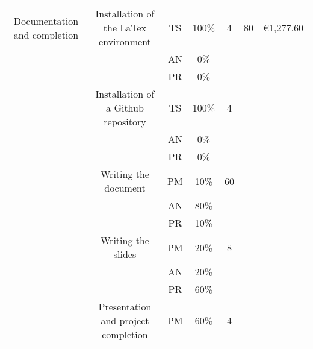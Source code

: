 \begin{table}[p]
\begin{center}
{\begin{tabular}{|c|l|c|c|l|l|l|}
\multicolumn{ 1}{|c|}{Documentation and completion} & \multicolumn{ 1}{c|}{Installation of the LaTex environment} & TS & 100\% & \multicolumn{ 1}{c|}{4} & \multicolumn{ 1}{c|}{80} & \multicolumn{ 1}{c|}{\textgreek{\euro}1,277.60} \\ \cline{ 3- 4}
\multicolumn{ 1}{|c|}{} & \multicolumn{ 1}{l|}{} & AN & 0\% & \multicolumn{ 1}{l|}{} & \multicolumn{ 1}{l|}{} & \multicolumn{ 1}{l|}{} \\ \cline{ 3- 4}
\multicolumn{ 1}{|c|}{} & \multicolumn{ 1}{l|}{} & PR & 0\% & \multicolumn{ 1}{l|}{} & \multicolumn{ 1}{l|}{} & \multicolumn{ 1}{l|}{} \\ \cline{ 2- 5}
\multicolumn{ 1}{|c|}{} & \multicolumn{ 1}{c|}{Installation of a Github repository} & TS & 100\% & \multicolumn{ 1}{c|}{4} & \multicolumn{ 1}{l|}{} & \multicolumn{ 1}{l|}{} \\ \cline{ 3- 4}
\multicolumn{ 1}{|c|}{} & \multicolumn{ 1}{l|}{} & AN & 0\% & \multicolumn{ 1}{l|}{} & \multicolumn{ 1}{l|}{} & \multicolumn{ 1}{l|}{} \\ \cline{ 3- 4}
\multicolumn{ 1}{|c|}{} & \multicolumn{ 1}{l|}{} & PR & 0\% & \multicolumn{ 1}{l|}{} & \multicolumn{ 1}{l|}{} & \multicolumn{ 1}{l|}{} \\ \cline{ 2- 5}
\multicolumn{ 1}{|c|}{} & \multicolumn{ 1}{c|}{Writing the document} & PM & 10\% & \multicolumn{ 1}{c|}{60} & \multicolumn{ 1}{l|}{} & \multicolumn{ 1}{l|}{} \\ \cline{ 3- 4}
\multicolumn{ 1}{|c|}{} & \multicolumn{ 1}{l|}{} & AN & 80\% & \multicolumn{ 1}{l|}{} & \multicolumn{ 1}{l|}{} & \multicolumn{ 1}{l|}{} \\ \cline{ 3- 4}
\multicolumn{ 1}{|c|}{} & \multicolumn{ 1}{l|}{} & PR & 10\% & \multicolumn{ 1}{l|}{} & \multicolumn{ 1}{l|}{} & \multicolumn{ 1}{l|}{} \\ \cline{ 2- 5}
\multicolumn{ 1}{|c|}{} & \multicolumn{ 1}{c|}{Writing the slides} & PM & 20\% & \multicolumn{ 1}{c|}{8} & \multicolumn{ 1}{l|}{} & \multicolumn{ 1}{l|}{} \\ \cline{ 3- 4}
\multicolumn{ 1}{|c|}{} & \multicolumn{ 1}{l|}{} & AN & 20\% & \multicolumn{ 1}{l|}{} & \multicolumn{ 1}{l|}{} & \multicolumn{ 1}{l|}{} \\ \cline{ 3- 4}
\multicolumn{ 1}{|c|}{} & \multicolumn{ 1}{l|}{} & PR & 60\% & \multicolumn{ 1}{l|}{} & \multicolumn{ 1}{l|}{} & \multicolumn{ 1}{l|}{} \\ \cline{ 2- 5}
\multicolumn{ 1}{|c|}{} & \multicolumn{ 1}{c|}{Presentation and project completion} & PM & 60\% & \multicolumn{ 1}{c|}{4} & \multicolumn{ 1}{l|}{} & \multicolumn{ 1}{l|}{} \\ \cline{ 3- 4}

\end{tabular}}
\end{center}
\end{table}
